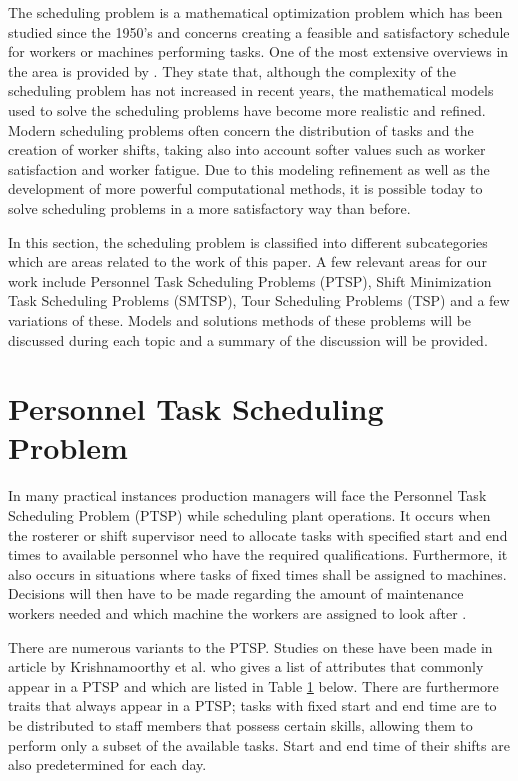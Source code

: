 
The scheduling problem is a mathematical optimization problem which has been studied since the 1950's and concerns creating a feasible and satisfactory schedule for workers or machines performing tasks. One of the most extensive overviews in the area is provided by \citet{ernst_2004}. They state that, although the complexity of the scheduling problem has not increased in recent years, the mathematical models used to solve the scheduling problems have become more realistic and refined. Modern scheduling problems often concern the distribution of tasks and the creation of worker shifts, taking also into account softer values such as worker satisfaction and worker fatigue. Due to this modeling refinement as well as the development of more powerful computational methods, it is possible today to solve scheduling problems in a more satisfactory way than before.

In this section, the scheduling problem is classified into different subcategories which are areas related to the work of this paper. A few relevant areas for our work include Personnel Task Scheduling Problems (PTSP), Shift Minimization Task Scheduling Problems (SMTSP), Tour Scheduling Problems (TSP) and a few variations of these. Models and solutions methods of these problems will be discussed during each topic and a summary of the discussion will be provided.


\section{Personnel Task Scheduling Problem} \label{PTSP}

In many practical instances production managers will face the Personnel Task Scheduling Problem (PTSP) while scheduling plant operations. It occurs when the rosterer or shift supervisor need to allocate tasks with specified start and end times to available personnel who have the required qualifications. Furthermore, it also occurs in situations where tasks of fixed times shall be assigned to machines. Decisions will then have to be made regarding the amount of maintenance workers needed and which machine the workers are assigned to look after \citet{krishnamoorthy_2001}.

There are numerous variants to the PTSP. Studies on these have been made in article \citet{krishnamoorthy_2001} by Krishnamoorthy et al. who gives a list of attributes that commonly appear in a PTSP and which are listed in Table \ref{PTSP} below. There are furthermore traits that always appear in a PTSP; tasks with fixed start and end time are to be distributed to staff members that possess certain skills, allowing them to perform only a subset of the available tasks. Start and end time of their shifts are also predetermined for each day.

